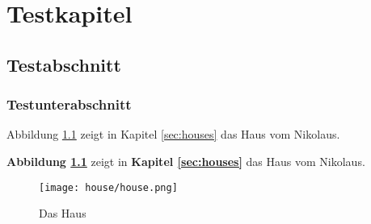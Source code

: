 \documentclass[12pt,a4paper]{scrbook}
\newcommand{\Abb}[1]{\textbf{Abbildung \ref{#1}}}
\newcommand{\Kap}[1]{\textbf{Kapitel \ref{#1}}}
\begin{document}
\chapter{Testkapitel}
\section{Testabschnitt}
\subsection{Testunterabschnitt}
\clearpage

Abbildung \ref{fig:house} zeigt in Kapitel \ref{sec:houses} das Haus vom Nikolaus. 

\Abb{fig:house} zeigt in \Kap{sec:houses} das Haus vom Nikolaus. 

\clearpage
\begin{figure}[htb]
	\centering
	\texttt{[image: house/house.png]}
	\caption{Das Haus}
	\label{fig:house}
\end{figure}
\label{sec:houses}
\end{document}
